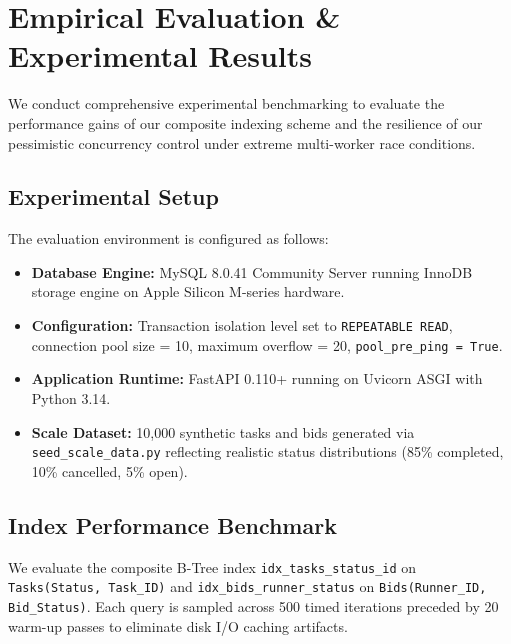 \documentclass[conference]{IEEEtran}
\begin{document}
\section{Empirical Evaluation \& Experimental Results}
We conduct comprehensive experimental benchmarking to evaluate the performance gains of our composite indexing scheme and the resilience of our pessimistic concurrency control under extreme multi-worker race conditions.

\subsection{Experimental Setup}
The evaluation environment is configured as follows:
\begin{itemize}
    \item \textbf{Database Engine:} MySQL 8.0.41 Community Server running InnoDB storage engine on Apple Silicon M-series hardware.
    \item \textbf{Configuration:} Transaction isolation level set to \texttt{REPEATABLE READ}, connection pool size = 10, maximum overflow = 20, \texttt{pool\_pre\_ping = True}.
    \item \textbf{Application Runtime:} FastAPI 0.110+ running on Uvicorn ASGI with Python 3.14.
    \item \textbf{Scale Dataset:} 10,000 synthetic tasks and bids generated via \texttt{seed\_scale\_data.py} reflecting realistic status distributions (85\% completed, 10\% cancelled, 5\% open).
\end{itemize}

\subsection{Index Performance Benchmark}
We evaluate the composite B-Tree index \texttt{idx\_tasks\_status\_id} on \texttt{Tasks(Status, Task\_ID)} and \texttt{idx\_bids\_runner\_status} on \texttt{Bids(Runner\_ID, Bid\_Status)}. Each query is sampled across 500 timed iterations preceded by 20 warm-up passes to eliminate disk I/O caching artifacts.
\end{document}

